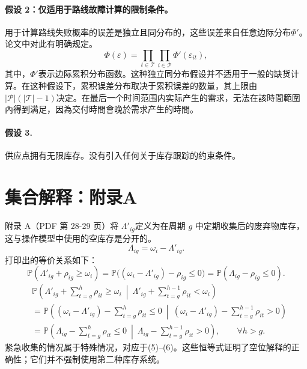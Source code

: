 \documentclass[10pt]{article}
\begin{document}
\paragraph{假设 2：仅适用于路线故障计算的限制条件。}
用于计算路线失败概率的误差是独立且同分布的，这些误差来自任意边际分布$\Phi'$。论文中对此有明确规定。
\begin{equation}
\Phi(\varepsilon)=\prod_{t\in\mathcal T}\prod_{i\in\mathcal P}\Phi'(\varepsilon_{it}),
\tag{10}
\end{equation}
其中，$\Phi'$表示边际累积分布函数。这种独立同分布假设并不适用于一般的缺货计算。在这种假设下，累积误差分布取决于累积误差的数量，其上限由$|\mathcal P|(|\mathcal T|-1)$决定。在最后一个时间范围内实际产生的需求，无法在該時間範圍內得到满足，因為交付時間會晚於需求产生的時間。

\paragraph{假设 3.}
供应点拥有无限库存。没有引入任何关于库存跟踪的约束条件。

\section*{集合解释：附录A}
附录 A（PDF 第 28-29 页）将 $\Lambda'_{ig}$定义为在周期 $g$ 中定期收集后的废弃物库存，这与操作模型中使用的空库存是分开的。
\[
\Lambda_{ig}=\omega_i-\Lambda'_{ig}.
\]
打印出的等价关系如下：
\begin{equation}
\mathbb P(\Lambda'_{ig}+\rho_{ig}\geqslant\omega_i)
=\mathbb P\bigl((\omega_i-\Lambda'_{ig})-\rho_{ig}\leqslant0\bigr)
=\mathbb P(\Lambda_{ig}-\rho_{ig}\leqslant0).
\tag{A.1}
\end{equation}
\begin{equation}
\begin{aligned}
&\mathbb P\left(\Lambda'_{ig}+\sum_{t=g}^{h}\rho_{it}\geqslant\omega_i\ \middle|\ \Lambda'_{ig}+\sum_{t=g}^{h-1}\rho_{it}<\omega_i\right)\\
&=\mathbb P\left((\omega_i-\Lambda'_{ig})-\sum_{t=g}^{h}\rho_{it}\leqslant0\ \middle|\ (\omega_i-\Lambda'_{ig})-\sum_{t=g}^{h-1}\rho_{it}>0\right)\\
&=\mathbb P\left(\Lambda_{ig}-\sum_{t=g}^{h}\rho_{it}\leqslant0\ \middle|\ \Lambda_{ig}-\sum_{t=g}^{h-1}\rho_{it}>0\right),\qquad\forall h>g.
\end{aligned}\tag{A.2}
\end{equation}
紧急收集的情况属于特殊情况，对应于(5)--(6)。这些恒等式证明了空位解释的正确性；它们并不强制使用第二种库存系统。
\end{document}
